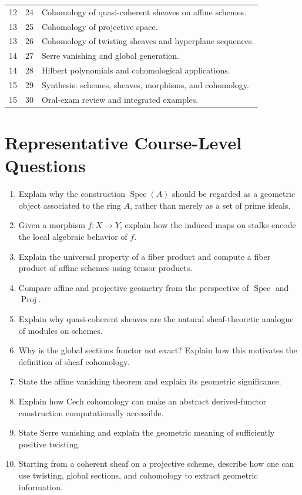 \documentclass[11pt]{article}
\begin{document}
\begin{longtable}{p{}p{}p{}}
12 & 24 & Cohomology of quasi-coherent sheaves on affine schemes. \\
13 & 25 & Cohomology of projective space. \\
13 & 26 & Cohomology of twisting sheaves and hyperplane sequences. \\
14 & 27 & Serre vanishing and global generation. \\
14 & 28 & Hilbert polynomials and cohomological applications. \\
15 & 29 & Synthesis: schemes, sheaves, morphisms, and cohomology. \\
15 & 30 & Oral-exam review and integrated examples. \\
\bottomrule
\end{longtable}

\section{Representative Course-Level Questions}

\begin{enumerate}
    \item Explain why the construction $\operatorname{Spec}(A)$ should be regarded as a geometric object associated to the ring $A$, rather than merely as a set of prime ideals.
    
    \item Given a morphism $f:X\to Y$, explain how the induced maps on stalks encode the local algebraic behavior of $f$.
    
    \item Explain the universal property of a fiber product and compute a fiber product of affine schemes using tensor products.
    
    \item Compare affine and projective geometry from the perspective of $\operatorname{Spec}$ and $\operatorname{Proj}$.
    
    \item Explain why quasi-coherent sheaves are the natural sheaf-theoretic analogue of modules on schemes.
    
    \item Why is the global sections functor not exact? Explain how this motivates the definition of sheaf cohomology.
    
    \item State the affine vanishing theorem and explain its geometric significance.
    
    \item Explain how Cech cohomology can make an abstract derived-functor construction computationally accessible.
    
    \item State Serre vanishing and explain the geometric meaning of sufficiently positive twisting.
    
    \item Starting from a coherent sheaf on a projective scheme, describe how one can use twisting, global sections, and cohomology to extract geometric information.
\end{enumerate}
\end{document}
